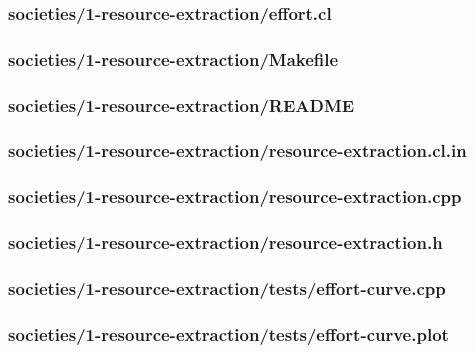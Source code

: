 \documentclass{article}
\begin{document}
\subsubsection*{societies/1-resource-extraction/effort.cl}


\subsubsection*{societies/1-resource-extraction/Makefile}


\subsubsection*{societies/1-resource-extraction/README}


\subsubsection*{societies/1-resource-extraction/resource-extraction.cl.in}


\subsubsection*{societies/1-resource-extraction/resource-extraction.cpp}


\subsubsection*{societies/1-resource-extraction/resource-extraction.h}


\subsubsection*{societies/1-resource-extraction/tests/effort-curve.cpp}


\subsubsection*{societies/1-resource-extraction/tests/effort-curve.plot}

\end{document}
